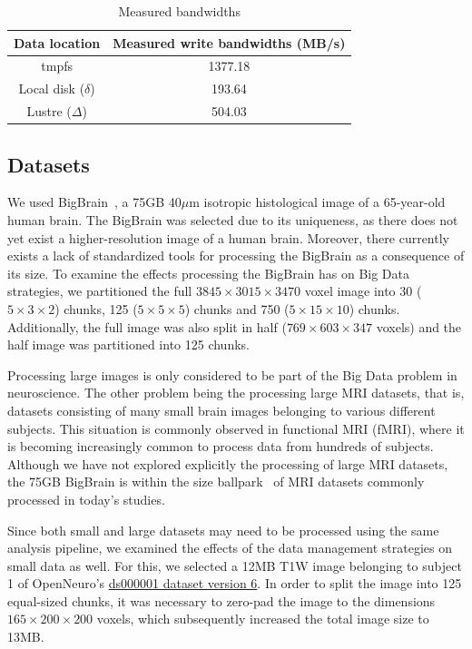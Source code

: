 \begin{table}
\centering
\begin{tabular}{c|c}
\rowcolor{headcolor}
Data location & Measured write bandwidths (MB/s)\\
\hline
tmpfs                 & 1377.18 \\
Local disk ($\delta$) & 193.64  \\
Lustre   ($\Delta$)   & 504.03 \\
\end{tabular}
\setlength{\belowcaptionskip}{-10pt}
\caption{Measured bandwidths}
\label{table:bdwdths}
\end{table}

\subsection{Datasets} %

We used BigBrain~\cite{amunts2013bigbrain}, a 75GB 40$\mu$m isotropic 
histological image of a 65-year-old human brain. The BigBrain was selected due 
to its uniqueness, as there does not yet exist a
higher-resolution image of a human brain. Moreover, there currently exists a 
lack of standardized tools for processing the BigBrain as a consequence 
of its size. To examine the effects processing the BigBrain has on Big Data 
strategies, we partitioned the full $3845\times3015\times3470$ voxel image into 30 ($5\times3\times2$)
chunks, 125 ($5\times5\times5$) chunks and 750 ($5\times15\times10$) chunks. Additionally, the full 
image was also split in half ($769\times603\times347$ voxels) and the half image was 
partitioned into 125 chunks.

Processing large images is only considered to be part of the Big Data problem 
in neuroscience. The other problem being the processing large MRI datasets, 
that is, datasets consisting of many small brain images belonging to 
various different subjects. This situation is commonly observed in 
functional MRI (fMRI), where it is becoming increasingly common to 
process data from hundreds of subjects. Although we have not explored 
explicitly the processing of large MRI datasets, the 75GB BigBrain is 
within the size ballpark~\cite{van2014human} of 
MRI datasets commonly processed in today's studies.

Since both small and large datasets may need to be processed using
the same analysis pipeline, we 
examined the effects of the data management strategies on small 
data as well. For this, we selected a 12MB T1W image belonging to 
subject 1 of OpenNeuro's 
\href{https://openneuro.org/datasets/ds000001/versions/00006/file-display/sub-01:anat:sub-01_T1w.nii.gz}{ds000001 
dataset version 6}. In order to split the image into 125 equal-sized chunks, it 
was necessary to zero-pad the image to the dimensions
$165\times200\times200$ voxels, which subsequently increased the total image size to 13MB.

